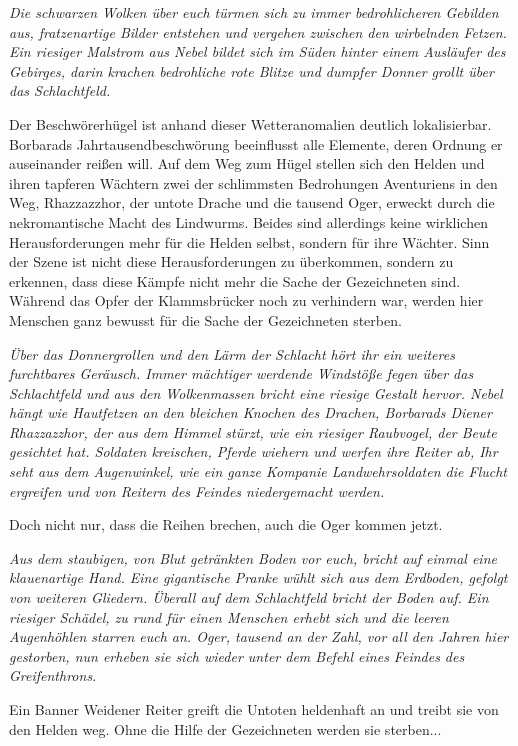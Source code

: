 \emph{Die schwarzen Wolken über euch türmen sich zu immer bedrohlicheren Gebilden aus, fratzenartige Bilder entstehen und vergehen zwischen den wirbelnden Fetzen. Ein riesiger Malstrom aus Nebel bildet sich im Süden hinter einem Ausläufer des Gebirges, darin krachen bedrohliche rote Blitze und dumpfer Donner grollt über das Schlachtfeld.}

Der Beschwörerhügel ist anhand dieser Wetteranomalien deutlich lokalisierbar. Borbarads Jahrtausendbeschwörung beeinflusst alle Elemente, deren Ordnung er auseinander reißen will. Auf dem Weg zum Hügel stellen sich den Helden und ihren tapferen Wächtern zwei der schlimmsten Bedrohungen Aventuriens in den Weg, Rhazzazzhor, der untote Drache und die tausend Oger, erweckt durch die nekromantische Macht des Lindwurms. Beides sind allerdings keine wirklichen Herausforderungen mehr für die Helden selbst, sondern für ihre Wächter. Sinn der Szene ist nicht diese Herausforderungen zu überkommen, sondern zu erkennen, dass diese Kämpfe nicht mehr die Sache der Gezeichneten sind. Während das Opfer der Klammsbrücker noch zu verhindern war, werden hier Menschen ganz bewusst für die Sache der Gezeichneten sterben.

\emph{Über das Donnergrollen und den Lärm der Schlacht hört ihr ein weiteres furchtbares Geräusch. Immer mächtiger werdende Windstöße fegen über das Schlachtfeld und aus den Wolkenmassen bricht eine riesige Gestalt hervor. Nebel hängt wie Hautfetzen an den bleichen Knochen des Drachen, Borbarads Diener Rhazzazzhor, der aus dem Himmel stürzt, wie ein riesiger Raubvogel, der Beute gesichtet hat. Soldaten kreischen, Pferde wiehern und werfen ihre Reiter ab, Ihr seht aus dem Augenwinkel, wie ein ganze Kompanie Landwehrsoldaten die Flucht ergreifen und von Reitern des Feindes niedergemacht werden.}

Doch nicht nur, dass die Reihen brechen, auch die Oger kommen jetzt.

\emph{Aus dem staubigen, von Blut getränkten Boden vor euch, bricht auf einmal eine klauenartige Hand. Eine gigantische Pranke wühlt sich aus dem Erdboden, gefolgt von weiteren Gliedern. Überall auf dem Schlachtfeld bricht der Boden auf. Ein riesiger Schädel, zu rund für einen Menschen erhebt sich und die leeren Augenhöhlen starren euch an. Oger, tausend an der Zahl, vor all den Jahren hier gestorben, nun erheben sie sich wieder unter dem Befehl eines Feindes des Greifenthrons.}

Ein Banner Weidener Reiter greift die Untoten heldenhaft an und treibt sie von den Helden weg. Ohne die Hilfe der Gezeichneten werden sie sterben...

